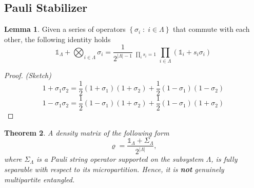 \documentclass[12font]{article}
\numberwithin{equation}{section}    %
\newtheorem{theorem}{Theorem}[section]
\theoremstyle{definition}
\newtheorem{lemma}[theorem]{Lemma}
\newcommand{\lr}[1]{\left(  #1  \right)}
\newcommand{\lrg}[1]{\left\{  #1  \right\}}
\newcommand{\abs}[1]{\left|  #1  \right|}
\begin{document}
\subsection{Pauli Stabilizer}
\begin{lemma}\label{lemma:pauli-decompose}
    Given a series of operators $\lrg{\sigma_i\;:\;i\in \Lambda }$ that commute with each other, the following identity holds
    \[
    \mathds{1}_\Lambda + \bigotimes_{i\in\Lambda}\sigma_i 
    = 
    \frac{1}{2^{\abs{\Lambda} - 1}} \mathop{\sum_{\lrg{s=\pm}}}_{\prod_is_i = 1}
    \prod_{i\in\Lambda}
    \lr{\mathds{1}_i + s_i\sigma_i}
    \]
\end{lemma}
\begin{proof}
\textit{(Sketch)}
    \[
    1+\sigma_1\sigma_2 = \frac{1}{2}\lr{1+\sigma_1}\lr{1+\sigma_2} + \frac{1}{2}\lr{1-\sigma_1}\lr{1-\sigma_2}
    \]
    \[
    1-\sigma_1\sigma_2 = \frac{1}{2}\lr{1-\sigma_1}\lr{1+\sigma_2} + \frac{1}{2}\lr{1-\sigma_1}\lr{1+\sigma_2}
    \]
\end{proof}
\begin{theorem}\label{lemma:single-stabilizer-generator}
    A density matrix of the following form
    \begin{equation}\label{eq:proj-rho-not-GME}
        \varrho = \frac{\mathds{1}_\Lambda + \Sigma_\Lambda}{2^{\abs{\Lambda}}},
    \end{equation}
    where $\Sigma_{\Lambda}$ is a Pauli string operator supported on the subsystem $\Lambda$, is fully separable with respect to its micropartition. Hence, it is \textit{\textbf{not} genuinely multipartite entangled}.
\end{theorem}
\end{document}

